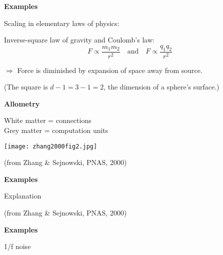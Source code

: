 

  \textbf{Examples}

Scaling in elementary laws of physics:

Inverse-square law of gravity
and Coulomb's law: 
$$F \propto \frac{m_1 m_2}{r^{2}}
\quad \mbox{and} \quad
F \propto \frac{q_1 q_2}{r^{2}}$$

$\Rightarrow$ Force is diminished by expansion of
space away from source.  

(The square is $d-1=3-1=2$, the dimension of
a sphere's surface.)








  \textbf{Allometry}

White matter = connections\\
Grey matter = computation units

\begin{center}
\texttt{[image: zhang2000fig2.jpg]}  
\end{center}

\hfill{\tiny(from Zhang \& Sejnowski, PNAS, 2000)}


  \textbf{Examples}

Explanation

\hfill{\tiny(from Zhang \& Sejnowski, PNAS, 2000)}



  \textbf{Examples}

1/f noise



\begin{comment}

percolation

\end{comment}



